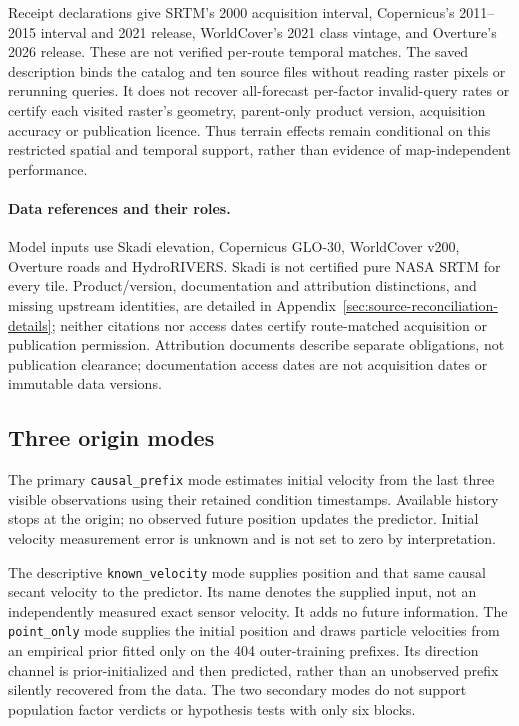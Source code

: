 \documentclass[11pt]{article}
\begin{document}
Receipt declarations give SRTM's 2000 acquisition interval, Copernicus's
2011--2015 interval and 2021 release, WorldCover's 2021 class vintage, and
Overture's 2026 release. These are not verified per-route temporal matches.
The saved description binds the catalog and ten source files without reading
raster pixels or rerunning queries. It does not recover all-forecast
per-factor invalid-query rates or certify each visited raster's geometry,
parent-only product version, acquisition accuracy or publication licence.
Thus terrain effects remain conditional on this restricted spatial and
temporal support, rather than evidence of map-independent performance.

\paragraph{Data references and their roles.}
\label{sec:data-reference-roles}
Model inputs use Skadi elevation\cite{mapzenterrain}, Copernicus GLO-30\cite{copernicusdem2021},
WorldCover v200\cite{worldcover2021}, Overture roads\cite{overture202608}
and HydroRIVERS\cite{hydrorivers2013}. Skadi is not certified pure NASA SRTM
for every tile. Product/version, documentation and attribution distinctions,
and missing upstream identities, are detailed in
Appendix~\ref{sec:source-reconciliation-details}; neither citations nor
access dates certify route-matched acquisition or publication permission.
Attribution documents\cite{mapzenattribution,overtureattribution,hydroriverslicense}
describe separate obligations, not publication clearance; documentation access
dates are not acquisition dates or immutable data versions.

\subsection{Three origin modes}
The primary \texttt{causal\_prefix} mode estimates initial velocity from the
last three visible observations using their retained condition timestamps.
Available history stops at the origin; no observed future position updates
the predictor. Initial velocity measurement error is unknown and is not set
to zero by interpretation.

The descriptive \texttt{known\_velocity} mode supplies position and that same
causal secant velocity to the predictor. Its name denotes the supplied input,
not an independently measured exact sensor velocity. It adds no future
information. The \texttt{point\_only} mode supplies the initial position and
draws particle velocities from an empirical prior fitted only on the 404
outer-training prefixes. Its direction channel is prior-initialized and then
predicted, rather than an unobserved prefix silently recovered from the data.
The two secondary modes do not support population factor verdicts or
hypothesis tests with only six blocks.
\end{document}
